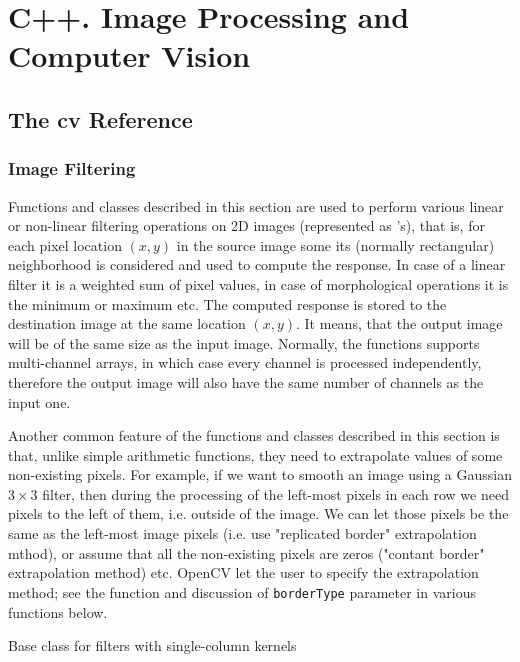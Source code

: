 \chapter{C++. Image Processing and Computer Vision}

\section{The cv Reference}

\subsection{Image Filtering}\label{CV.Filtering}

Functions and classes described in this section are used to perform various linear or non-linear filtering operations on 2D images (represented as 's), that is, for each pixel location $(x,y)$ in the source image some its (normally rectangular) neighborhood is considered and used to compute the response. In case of a linear filter it is a weighted sum of pixel values, in case of morphological operations it is the minimum or maximum etc. The computed response is stored to the destination image at the same location $(x,y)$. It means, that the output image will be of the same size as the input image. Normally, the functions supports multi-channel arrays, in which case every channel is processed independently, therefore the output image will also have the same number of channels as the input one.

Another common feature of the functions and classes described in this section is that, unlike simple arithmetic functions, they need to extrapolate values of some non-existing pixels. For example, if we want to smooth an image using a Gaussian $3 \times 3$ filter, then during the processing of the left-most pixels in each row we need pixels to the left of them, i.e. outside of the image. We can let those pixels be the same as the left-most image pixels (i.e. use "replicated border" extrapolation mthod), or assume that all the non-existing pixels are zeros ("contant border" extrapolation method) etc. OpenCV let the user to specify the extrapolation method; see the function  and discussion of \texttt{borderType} parameter in various functions below.  

\label{BaseColumnFilter}
Base class for filters with single-column kernels

